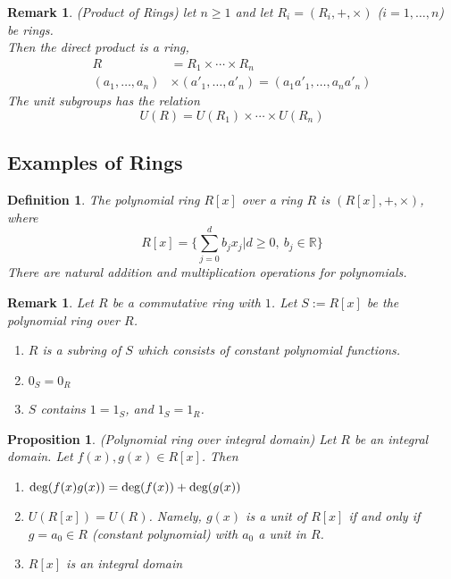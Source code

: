 \documentclass[a4paper,8pt]{article}
\newcommand{\hlt}[1]{\textit{{\color{blue}#1}}}
\newcommand{\degs}[1]{\textnormal{deg}#1}
\theoremstyle{theorem}
\newtheorem{proposition}[theorem]{Proposition}
\newtheorem{definition}[theorem]{Definition}
\newtheorem{remark}[theorem]{Remark}
\begin{document}
\begin{remark}
\hlt{(Product of Rings)} let $n \geq 1$ and let $R_i = (R_i, +, \times)$ ($i=1, \ldots, n$) be rings.\\
Then the direct product is a ring, 
\begin{align}
R &= R_1 \times \cdots \times R_n \nonumber \\
(a_1, \ldots, a_n) &\times (a'_1, \ldots, a'_n) = (a_1 a'_1, \ldots, a_n a'_n) \nonumber
\end{align}
The unit subgroups has the relation 
\begin{equation}
U(R) = U(R_1)\times \cdots \times U(R_n) \nonumber
\end{equation}
\end{remark}


\subsection{Examples of Rings}

\begin{definition}
The \hlt{polynomial ring $R[x]$ over a ring $R$} is $(R[x], +, \times)$,  where 
\begin{equation}
R[x] = \{\sum_{j=0}^{d} b_j x_j | d \geq 0, \ b_j \in \mathbb{R} \} \nonumber
\end{equation}
There are natural addition and multiplication operations for polynomials.\\
\end{definition}


\begin{remark}
Let $R$ be a commutative ring with $1$. Let $S:= R[x]$ be the polynomial ring over $R$.
\begin{enumerate}[label=(\roman*)]
\item $R$ is a subring of $S$ which consists of constant polynomial functions.
\item $0_S = 0_R$
\item $S$ contains $1=1_S$, and $1_S = 1_R$.
\end{enumerate}
\end{remark}


\begin{proposition}
\hlt{(Polynomial ring over integral domain)} Let $R$ be an integral domain. Let $f(x), g(x) \in R[x]$. Then
\begin{enumerate}[label=(\roman*)]
\item $\degs(f(x)g(x)) = \degs(f(x)) + \degs(g(x))$
\item $U(R[x]) = U(R)$. Namely, $g(x)$ is a unit of $R[x]$ if and only if $g=a_0 \in R$ (constant polynomial) with $a_0$ a unit in $R$.
\item $R[x]$ is an integral domain
\end{enumerate}
\end{proposition}
\end{document}
